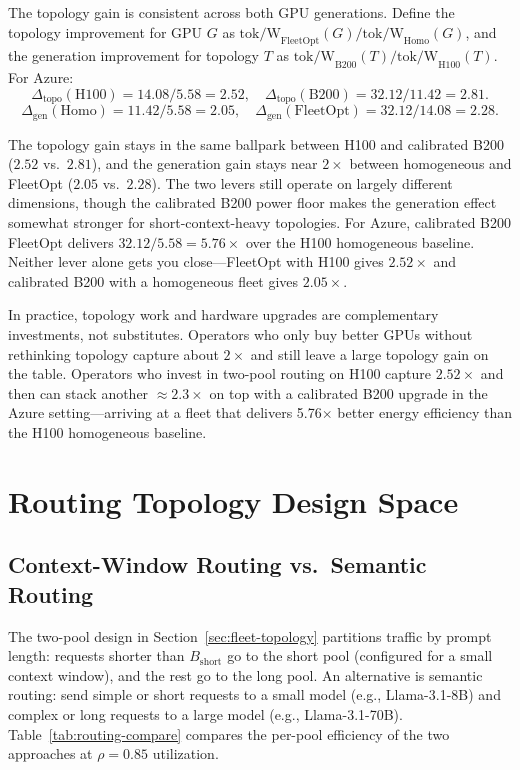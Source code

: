 \documentclass[11pt,a4paper]{article}
\newcommand{\tpw}{\text{tok/W}}
\begin{document}
The topology gain is consistent across both GPU generations.  Define the
topology improvement for GPU $G$ as $\tpw_{\text{FleetOpt}}(G) /
\tpw_{\text{Homo}}(G)$, and the generation improvement for topology $T$ as
$\tpw_{\text{B200}}(T) / \tpw_{\text{H100}}(T)$.  For Azure:
\[
  \Delta_{\text{topo}}(\text{H100}) = 14.08 / 5.58 = 2.52, \quad
  \Delta_{\text{topo}}(\text{B200}) = 32.12 / 11.42 = 2.81.
\]
\[
  \Delta_{\text{gen}}(\text{Homo}) = 11.42 / 5.58 = 2.05, \quad
  \Delta_{\text{gen}}(\text{FleetOpt}) = 32.12 / 14.08 = 2.28.
\]

The topology gain stays in the same ballpark between H100 and calibrated B200
($2.52$ vs.\ $2.81$), and the generation gain stays near $2\times$ between
homogeneous and FleetOpt ($2.05$ vs.\ $2.28$).  The two levers still operate
on largely different dimensions, though the calibrated B200 power floor makes
the generation effect somewhat stronger for short-context-heavy topologies.
For Azure, calibrated B200 FleetOpt delivers $32.12 / 5.58 = 5.76\times$ over
the H100 homogeneous baseline.  Neither lever alone gets you close---FleetOpt
with H100 gives $2.52\times$ and calibrated B200 with a homogeneous fleet gives
$2.05\times$.

In practice, topology work and hardware upgrades are complementary
investments, not substitutes.  Operators who only buy better
GPUs without rethinking topology capture about $2\times$ and still leave a large
topology gain on the table.  Operators who invest in two-pool routing on
H100 capture $2.52\times$ and then can stack another $\approx 2.3\times$ on top
with a calibrated B200 upgrade in the Azure setting---arriving at a fleet that
delivers 5.76$\times$ better energy efficiency than the H100 homogeneous baseline.

\section{Routing Topology Design Space}
\label{sec:design-space}

\subsection{Context-Window Routing vs.\ Semantic Routing}
\label{sec:context-vs-semantic}

The two-pool design in Section~\ref{sec:fleet-topology} partitions traffic by
prompt length: requests shorter than $B_{\text{short}}$ go to the short pool
(configured for a small context window), and the rest go to the long pool.
An alternative is semantic routing: send simple or short requests to a small
model (e.g., Llama-3.1-8B) and complex or long requests to a large model
(e.g., Llama-3.1-70B).  Table~\ref{tab:routing-compare} compares the per-pool
efficiency of the two approaches at $\rho = 0.85$ utilization.
\end{document}

